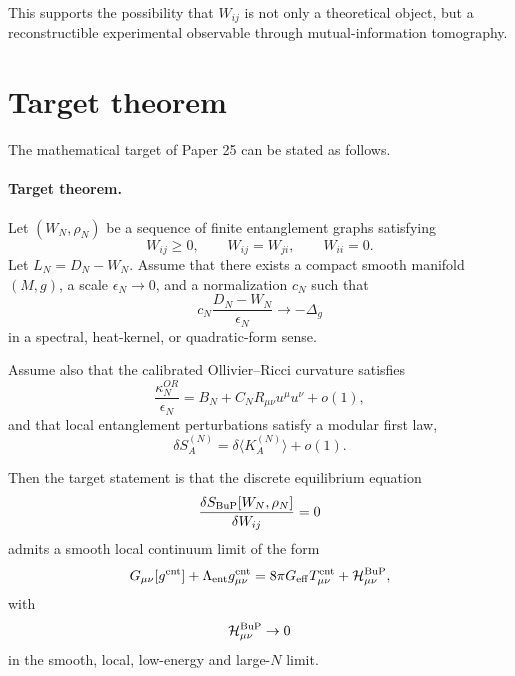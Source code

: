 \documentclass[11pt,a4paper]{article}
\begin{document}
This supports the possibility that \(W_{ij}\) is not only a theoretical object,
but a reconstructible experimental observable through mutual-information
tomography.

\section{Target theorem}

The mathematical target of Paper 25 can be stated as follows.

\paragraph{Target theorem.}
Let \((W_N,\rho_N)\) be a sequence of finite entanglement graphs satisfying
\begin{equation}
  W_{ij}\ge0,\qquad W_{ij}=W_{ji},\qquad W_{ii}=0.
\end{equation}
Let \(L_N=D_N-W_N\). Assume that there exists a compact smooth manifold
\((M,g)\), a scale \(\epsilon_N\to0\), and a normalization \(c_N\) such that
\begin{equation}
  c_N\frac{D_N-W_N}{\epsilon_N}\to-\Delta_g
\end{equation}
in a spectral, heat-kernel, or quadratic-form sense.

Assume also that the calibrated Ollivier--Ricci curvature satisfies
\begin{equation}
  \frac{\kappa_N^{OR}}{\epsilon_N}
  =
  B_N+C_NR_{\mu\nu}u^\mu u^\nu+o(1),
\end{equation}
and that local entanglement perturbations satisfy a modular first law,
\begin{equation}
  \delta S_A^{(N)}
  =
  \delta\langle K_A^{(N)}\rangle
  +
  o(1).
\end{equation}

Then the target statement is that the discrete equilibrium equation
\begin{equation}
  \frac{\delta S_{\rm BuP}[W_N,\rho_N]}{\delta W_{ij}}=0
\end{equation}
admits a smooth local continuum limit of the form
\begin{equation}
  G_{\mu\nu}[g^{\rm ent}]
  +
  \Lambda_{\rm ent}g_{\mu\nu}^{\rm ent}
  =
  8\pi G_{\rm eff}T_{\mu\nu}^{\rm ent}
  +
  \mathcal H_{\mu\nu}^{\rm BuP},
\end{equation}
with
\begin{equation}
  \mathcal H_{\mu\nu}^{\rm BuP}\to0
\end{equation}
in the smooth, local, low-energy and large-\(N\) limit.
\end{document}
